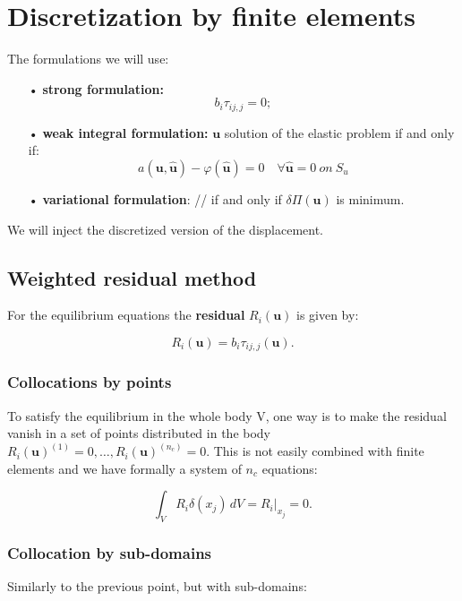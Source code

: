 
\chapter{Discretization by finite elements}
	The formulations we will use:
	
	\begin{itemize}
	\item[•] \textbf{strong formulation:}
	\begin{equation}
	b_i \tau _{ij,j} = 0;
	\end{equation}
	
	\item[•] \textbf{weak integral formulation:} $\bm{u}$ solution of the elastic problem if and only if:
	\begin{equation}
	a(\bm{u,\hat{u}}) - \varphi (\bm{\hat{u}}) = 0\quad \forall \bm{\hat{u}}	= 0 \ on \ S_u
	\end{equation}
	
	\item[•] \textbf{variational formulation}: // if and only if $\delta \Pi (\bm{u})$ is minimum. 
	\end{itemize}
	
	We will inject the discretized version of the displacement. 
	
\section{Weighted residual method}
	For the equilibrium equations the \textbf{residual} $R_i(\bm{u})$ is given by: 
	
	\begin{equation}
	R_i(\bm{u}) = b_i \tau _{ij,j}(\bm{u}). 
	\end{equation}
	
\subsection{Collocations by points}	
	To satisfy the equilibrium in the whole body V, one way is to make the residual vanish in a set of points distributed in the body $R_i(\bm{u})^{(1)}=0, \dots , R_i(\bm{u})^{(n_c)}=0$. This is not easily combined with finite elements and we have formally a system of $n_c$ equations:
	
	\begin{equation}
	\int _V R_i \delta (x_j)\, dV = R_i|_{x_j} = 0.
	\end{equation}
	
\subsection{Collocation by sub-domains}
	Similarly to the previous point, but with sub-domains: 
	
